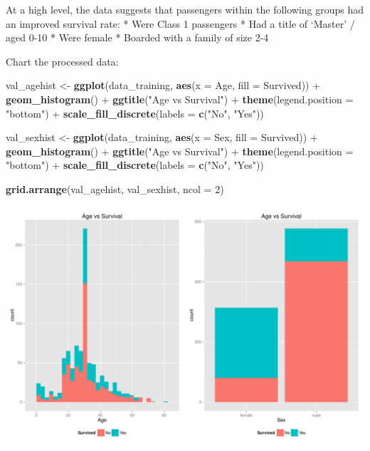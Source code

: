 \documentclass[]{article}
\newenvironment{Shaded}{\begin{snugshade}}{\end{snugshade}}
\newcommand{\KeywordTok}[1]{\textcolor[rgb]{0.13,0.29,0.53}{\textbf{{#1}}}}
\newcommand{\DataTypeTok}[1]{\textcolor[rgb]{0.13,0.29,0.53}{{#1}}}
\newcommand{\DecValTok}[1]{\textcolor[rgb]{0.00,0.00,0.81}{{#1}}}
\newcommand{\StringTok}[1]{\textcolor[rgb]{0.31,0.60,0.02}{{#1}}}
\newcommand{\NormalTok}[1]{{#1}}
\begin{document}
At a high level, the data suggests that passengers within the following
groups had an improved survival rate: * Were Class 1 passengers * Had a
title of `Master' / aged 0-10 * Were female * Boarded with a family of
size 2-4

Chart the processed data:

\begin{Shaded}
\begin{Highlighting}[]
\NormalTok{val_agehist <-}\StringTok{ }\KeywordTok{ggplot}\NormalTok{(data_training, }\KeywordTok{aes}\NormalTok{(}\DataTypeTok{x =} \NormalTok{Age, }\DataTypeTok{fill =} \NormalTok{Survived)) +}
\StringTok{                      }\KeywordTok{geom_histogram}\NormalTok{() +}
\StringTok{                      }\KeywordTok{ggtitle}\NormalTok{(}\StringTok{"Age vs Survival"}\NormalTok{) +}
\StringTok{                      }\KeywordTok{theme}\NormalTok{(}\DataTypeTok{legend.position =} \StringTok{"bottom"}\NormalTok{) +}
\StringTok{                      }\KeywordTok{scale_fill_discrete}\NormalTok{(}\DataTypeTok{labels =} \KeywordTok{c}\NormalTok{(}\StringTok{"No"}\NormalTok{, }\StringTok{"Yes"}\NormalTok{))}

\NormalTok{val_sexhist <-}\StringTok{ }\KeywordTok{ggplot}\NormalTok{(data_training, }\KeywordTok{aes}\NormalTok{(}\DataTypeTok{x =} \NormalTok{Sex, }\DataTypeTok{fill =} \NormalTok{Survived)) +}
\StringTok{                      }\KeywordTok{geom_histogram}\NormalTok{() +}
\StringTok{                      }\KeywordTok{ggtitle}\NormalTok{(}\StringTok{"Age vs Survival"}\NormalTok{) +}
\StringTok{                      }\KeywordTok{theme}\NormalTok{(}\DataTypeTok{legend.position =} \StringTok{"bottom"}\NormalTok{) +}
\StringTok{                      }\KeywordTok{scale_fill_discrete}\NormalTok{(}\DataTypeTok{labels =} \KeywordTok{c}\NormalTok{(}\StringTok{"No"}\NormalTok{, }\StringTok{"Yes"}\NormalTok{))}

\KeywordTok{grid.arrange}\NormalTok{(val_agehist, val_sexhist, }\DataTypeTok{ncol =} \DecValTok{2}\NormalTok{)}
\end{Highlighting}
\end{Shaded}

\includegraphics{figure/unnamed-chunk-7-1.pdf}
\end{document}
